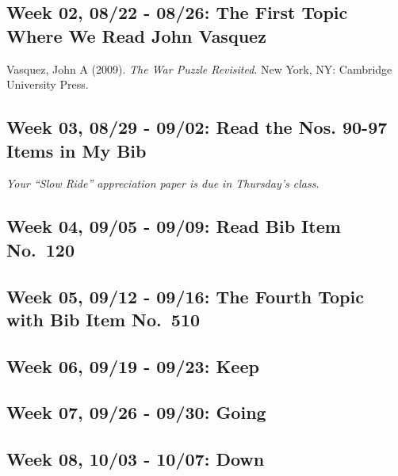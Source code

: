 \documentclass[11pt,]{article}
\begin{document}
\hypertarget{week-02-0822---0826-the-first-topic-where-we-read-john-vasquez}{%
\subsection{Week 02, 08/22 - 08/26: The First Topic Where We Read John
Vasquez}\label{week-02-0822---0826-the-first-topic-where-we-read-john-vasquez}}

Vasquez, John A (2009). \emph{The War Puzzle Revisited}. New York, NY:
Cambridge University Press.

\hypertarget{week-03-0829---0902-read-the-nos.-90-97-items-in-my-bib}{%
\subsection{Week 03, 08/29 - 09/02: Read the Nos. 90-97 Items in My
Bib}\label{week-03-0829---0902-read-the-nos.-90-97-items-in-my-bib}}

\emph{Your ``Slow Ride'' appreciation paper is due in Thursday's class}.

\hypertarget{week-04-0905---0909-read-bib-item-no.120}{%
\subsection{Week 04, 09/05 - 09/09: Read Bib Item
No.~120}\label{week-04-0905---0909-read-bib-item-no.120}}

\hypertarget{week-05-0912---0916-the-fourth-topic-with-bib-item-no.510}{%
\subsection{Week 05, 09/12 - 09/16: The Fourth Topic with Bib Item
No.~510}\label{week-05-0912---0916-the-fourth-topic-with-bib-item-no.510}}

\hypertarget{week-06-0919---0923-keep}{%
\subsection{Week 06, 09/19 - 09/23:
Keep}\label{week-06-0919---0923-keep}}

\hypertarget{week-07-0926---0930-going}{%
\subsection{Week 07, 09/26 - 09/30:
Going}\label{week-07-0926---0930-going}}

\hypertarget{week-08-1003---1007-down}{%
\subsection{Week 08, 10/03 - 10/07:
Down}\label{week-08-1003---1007-down}}
\end{document}
